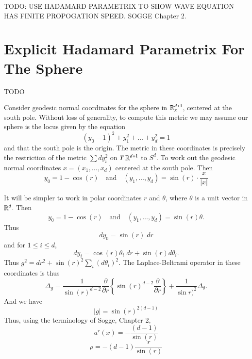 TODO: USE HADAMARD PARAMETRIX TO SHOW WAVE EQUATION HAS FINITE PROPOGATION SPEED. SOGGE Chapter 2.







\section{Explicit Hadamard Parametrix For The Sphere}

TODO

Consider geodesic normal coordinates for the sphere in $\operatorname{\mathbb{R}}^{d+1}_x$, centered at the south pole. Without loss of generality, to compute this metric we may assume our sphere is the locus given by the equation
%
\[ (y_0 - 1)^2 + y_1^2 + \dots + y_d^2 = 1 \]
%
and that the south pole is the origin. The metric in these coordinates is precisely the restriction of the metric $\sum dy_i^2$ on $T \operatorname{\mathbb{R}}^{d+1}$ to $S^d$. To work out the geodesic normal coordinates $x = (x_1,\dots,x_d)$ centered at the south pole. Then
%
\[ y_0 = 1 - \cos(r) \quad\text{and}\quad (y_1,\dots,y_d) = \sin(r) \cdot \frac{x}{|x|} \]


It will be simpler to work in polar coordinates $r$ and $\theta$, where $\theta$ is a unit vector in $\operatorname{\mathbb{R}}^d$. Then
%
\[ y_0 = 1 - \cos(r) \quad\text{and}\quad (y_1,\dots,y_d) = \sin(r) \theta. \]
%
Thus
%
\[ dy_0 = \sin(r)\; dr \]
%
and for $1 \leq i \leq d$,
%
\[ dy_i = \cos(r) \theta_i\; dr + \sin(r) d\theta_i. \]
%
%
%
%
%
Thus $g^2 = dr^2 + \sin(r)^2 \sum_i (d\theta_i)^2$. The Laplace-Beltrami operator in these coordinates is thus
% 
\[ \Delta_g = \frac{1}{\sin(r)^{d-2}} \frac{\partial}{\partial r} \left\{ \sin(r)^{d-2} \frac{\partial}{\partial r} \right\} + \frac{1}{\sin r)^2} \Delta_\theta. \]
%
And we have
%
\[ |g| = \sin(r)^{2(d-1)} \]
%
Thus, using the terminology of Sogge, Chapter 2,
%
\[ a^r(x) = - \frac{(d-1)}{\sin(r)} \]
%
\[ \rho = - (d-1) \frac{r}{\sin(r)} \]


